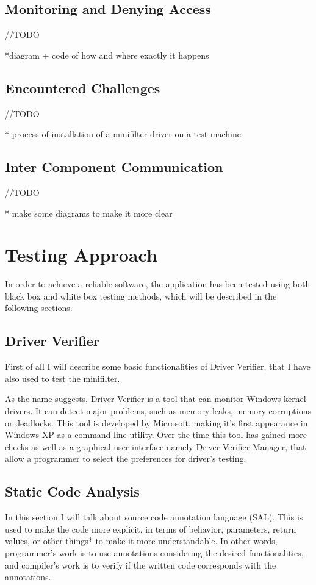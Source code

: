 		\subsection{Monitoring and Denying Access}
		//TODO
		
		*diagram + code of how and where exactly it happens
		
		\subsection{Encountered Challenges}
		//TODO  
		
		* process of installation of a minifilter driver on a test machine
		
		\subsection{Inter Component Communication}
		//TODO
		
		* make some diagrams to make it more clear
		
		
	\newpage
	
	\section{Testing Approach}
		In order to achieve a reliable software, the application has been tested using both black box and white box testing methods, which will be described in the following sections.
		
		\subsection{Driver Verifier}
		First of all I will describe some basic functionalities of Driver Verifier, that I have also used to test the minifilter.
		
		As the name suggests, Driver Verifier is a tool that can monitor Windows kernel drivers. It can detect major problems, such as memory leaks, memory corruptions or deadlocks. This tool is developed by Microsoft, making it's first appearance in Windows XP as a command line utility. Over the time this tool has gained more checks as well as a graphical user interface namely Driver Verifier Manager, that allow a programmer to select the preferences for driver's testing.
		
		\subsection{Static Code Analysis}
		In this section I will talk about source code annotation language (SAL). This is used to make the code more explicit, in terms of behavior, parameters, return values, or other things* to make it more understandable. In other words, programmer's work is to use annotations considering the desired functionalities, and compiler's work is to verify if the written code corresponds with the annotations. 
		
